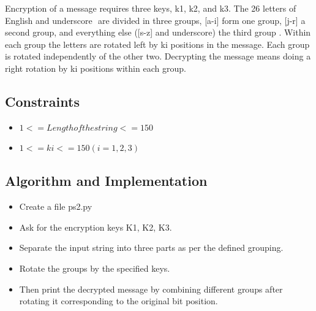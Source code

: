 \documentclass[12pt]{article}
\begin{document}
		Encryption of a message requires three keys, k1, k2, and k3. The ​26 letters of English and
		underscore ​ are divided in three groups, ​[a-i] form one group, [j-r] a second group, and
		everything else ([s-z] and underscore) the third group ​. Within each group the letters are
		rotated left by ki positions in the message. Each group is rotated independently of the other
		two. Decrypting the message means doing a right rotation by ki positions within each group.
			\begin{figure}[h!]
				\centering
			\end{figure}
			
		\subsection{Constraints}
		
			\begin{itemize}
				\item $1 <= Length of the string <=150$
				\item $1<= ki <=150 (i=1,2,3)$
			\end{itemize}
		
		\subsection{Algorithm and Implementation~\cite{problem2}~\cite{problem3}}
		
			\begin{itemize}
			\item Create a file ps2.py
			\item Ask for the encryption keys K1, K2, K3.
			\item Separate the input string into three parts as per the defined grouping.
			\item Rotate the groups by the specified keys.
			\item Then print the decrypted message by combining different groups after rotating it corresponding to the original bit position.  
			\end{itemize}
		\newpage
\end{document}
